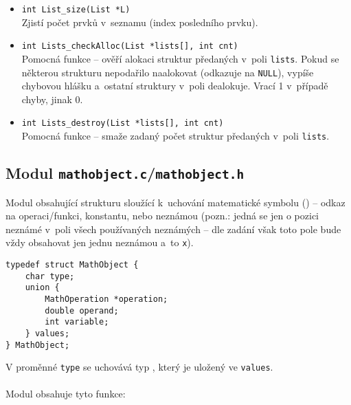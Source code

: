 \documentclass[pdftex,a4paper]{article}
\begin{document}
\begin{itemize}
\item \texttt{int List\_size(List *L)} \\ Zjistí počet prvků v~seznamu (index posledního prvku).

\item \texttt{int Lists\_checkAlloc(List *lists[], int cnt)} \\ Pomocná funkce -- ověří alokaci struktur předaných v~poli \texttt{lists}. Pokud se některou strukturu nepodařilo naalokovat (odkazuje na \texttt{NULL}), vypíše chybovou hlášku a~ostatní struktury v~poli dealokuje. Vrací 1 v~případě chyby, jinak 0.

\item \texttt{int Lists\_destroy(List *lists[], int cnt)} \\ Pomocná funkce -- smaže zadaný počet struktur předaných v~poli \texttt{lists}.

\end{itemize}




\subsection{Modul \texttt{mathobject.c}/\texttt{mathobject.h}}
Modul obsahující strukturu sloužící k~uchování matematické symbolu () -- odkaz na operaci/funkci, konstantu, nebo neznámou (pozn.: jedná se jen o pozici neznámé v~poli všech používaných neznámých -- dle zadání však toto pole bude vždy obsahovat jen jednu neznámou a~to \texttt{x}).

\begin{lstlisting}
typedef struct MathObject {
    char type;
    union {
        MathOperation *operation;
        double operand;
        int variable;
    } values;
} MathObject;
\end{lstlisting}
%
V proměnné \texttt{type} se uchovává typ , který je uložený ve \texttt{values}. 
\\\\
Modul obsahuje tyto funkce:
\end{document}
